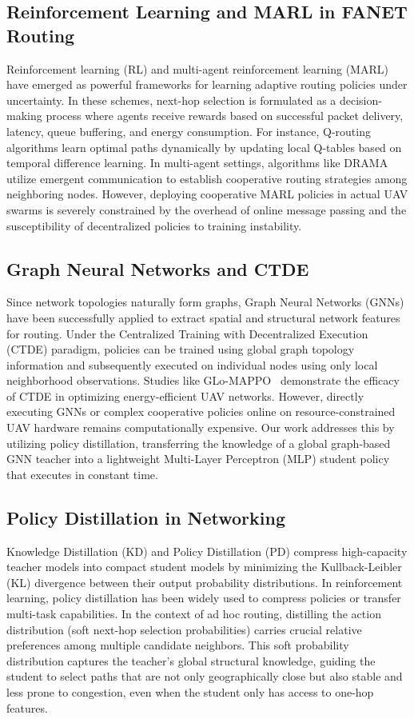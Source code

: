 \subsection{Reinforcement Learning and MARL in FANET Routing}
Reinforcement learning (RL) and multi-agent reinforcement learning (MARL) have emerged as powerful frameworks for learning adaptive routing policies under uncertainty. In these schemes, next-hop selection is formulated as a decision-making process where agents receive rewards based on successful packet delivery, latency, queue buffering, and energy consumption. For instance, Q-routing algorithms learn optimal paths dynamically by updating local Q-tables based on temporal difference learning. In multi-agent settings, algorithms like DRAMA~\cite{drama} utilize emergent communication to establish cooperative routing strategies among neighboring nodes. However, deploying cooperative MARL policies in actual UAV swarms is severely constrained by the overhead of online message passing and the susceptibility of decentralized policies to training instability.

\subsection{Graph Neural Networks and CTDE}
Since network topologies naturally form graphs, Graph Neural Networks (GNNs) have been successfully applied to extract spatial and structural network features for routing. Under the Centralized Training with Decentralized Execution (CTDE) paradigm, policies can be trained using global graph topology information and subsequently executed on individual nodes using only local neighborhood observations. Studies like GLo-MAPPO~\cite{glo_mappo} demonstrate the efficacy of CTDE in optimizing energy-efficient UAV networks. However, directly executing GNNs or complex cooperative policies online on resource-constrained UAV hardware remains computationally expensive. Our work addresses this by utilizing policy distillation, transferring the knowledge of a global graph-based GNN teacher into a lightweight Multi-Layer Perceptron (MLP) student policy that executes in constant time.

\subsection{Policy Distillation in Networking}
Knowledge Distillation (KD) and Policy Distillation (PD) compress high-capacity teacher models into compact student models by minimizing the Kullback-Leibler (KL) divergence between their output probability distributions. In reinforcement learning, policy distillation has been widely used to compress policies or transfer multi-task capabilities. In the context of ad hoc routing, distilling the action distribution (soft next-hop selection probabilities) carries crucial relative preferences among multiple candidate neighbors. This soft probability distribution captures the teacher's global structural knowledge, guiding the student to select paths that are not only geographically close but also stable and less prone to congestion, even when the student only has access to one-hop features.

